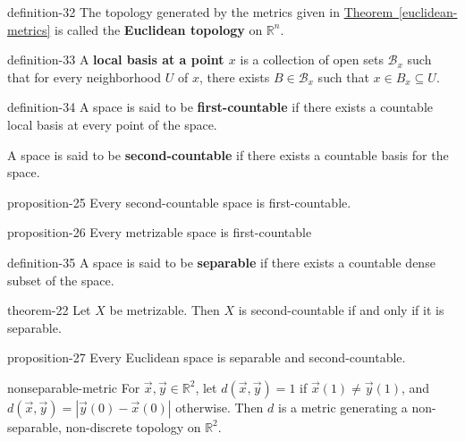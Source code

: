\documentclass[10pt,]{article}
\newcommand{\terminology}[1]{\textbf{#1}}
\newcommand{\mb}{\mathbb}
\newcommand{\mc}{\mathcal}
\begin{document}
\begin{definition}{}{definition-32}%
\hypertarget{p-115}{}%
The topology generated by the metrics given in \hyperref[euclidean-metrics]{Theorem~\ref{euclidean-metrics}} is called the \terminology{Euclidean topology} on \(\mb R^n\).%
\end{definition}
\begin{definition}{}{definition-33}%
\hypertarget{p-116}{}%
A \terminology{local basis at a point \(x\)} is a collection of open sets \(\mc B_x\) such that for every neighborhood \(U\) of \(x\), there exists \(B\in\mc B_x\) such that \(x\in B_x\subseteq U\).%
\end{definition}
\begin{definition}{}{definition-34}%
\hypertarget{p-117}{}%
A space is said to be \terminology{first-countable} if there exists a countable local basis at every point of the space.%
\par
\hypertarget{p-118}{}%
A space is said to be \terminology{second-countable} if there exists  a countable basis for the space.%
\end{definition}
\begin{proposition}{}{}{proposition-25}%
\hypertarget{p-119}{}%
Every second-countable space is first-countable.%
\end{proposition}
\begin{proposition}{}{}{proposition-26}%
\hypertarget{p-120}{}%
Every metrizable space is first-countable%
\end{proposition}
\begin{definition}{}{definition-35}%
\hypertarget{p-121}{}%
A space is said to be \terminology{separable} if there exists a countable dense subset of the space.%
\end{definition}
\begin{theorem}{}{}{theorem-22}%
\hypertarget{p-122}{}%
Let \(X\) be metrizable. Then \(X\) is second-countable if and only if it is separable.%
\end{theorem}
\begin{proposition}{}{}{proposition-27}%
\hypertarget{p-123}{}%
Every Euclidean space is separable and second-countable.%
\end{proposition}
\begin{theorem}{}{}{nonseparable-metric}%
\hypertarget{p-124}{}%
For \(\vec x,\vec y\in\mb R^2\), let \(d(\vec x,\vec y)=1\) if \(\vec x(1)\not=\vec y(1)\), and \(d(\vec x,\vec y)=|\vec y(0)-\vec x(0)|\) otherwise. Then \(d\) is a metric generating a non-separable, non-discrete topology on \(\mb R^2\).%
\end{theorem}
\end{document}
